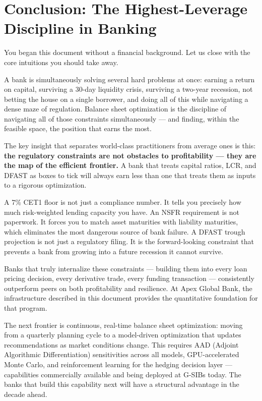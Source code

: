 \documentclass[12pt,a4paper]{article}
\begin{document}
\section{Conclusion: The Highest-Leverage Discipline in Banking}

You began this document without a financial background.  Let us close with the
core intuitions you should take away.

A bank is simultaneously solving several hard problems at once: earning a
return on capital, surviving a 30-day liquidity crisis, surviving a two-year
recession, not betting the house on a single borrower, and doing all of this
while navigating a dense maze of regulation.  Balance sheet optimization is
the discipline of navigating all of those constraints simultaneously ---
and finding, within the feasible space, the position that earns the most.

The key insight that separates world-class practitioners from average ones
is this: \textbf{the regulatory constraints are not obstacles to profitability
--- they are the map of the efficient frontier.}  A bank that treats capital
ratios, LCR, and DFAST as boxes to tick will always earn less than one that
treats them as inputs to a rigorous optimization.

A 7\% CET1 floor is not just a compliance number.  It tells you precisely
how much risk-weighted lending capacity you have.  An NSFR requirement is
not paperwork.  It forces you to match asset maturities with liability
maturities, which eliminates the most dangerous source of bank failure.
A DFAST trough projection is not just a regulatory filing.  It is the
forward-looking constraint that prevents a bank from growing into a future
recession it cannot survive.

Banks that truly internalize these constraints --- building them into every
loan pricing decision, every derivative trade, every funding transaction ---
consistently outperform peers on both profitability and resilience.
At Apex Global Bank, the infrastructure described in this document provides
the quantitative foundation for that program.

The next frontier is continuous, real-time balance sheet optimization:
moving from a quarterly planning cycle to a model-driven optimization
that updates recommendations as market conditions change.  This requires
AAD (Adjoint Algorithmic Differentiation) sensitivities across all models,
GPU-accelerated Monte Carlo, and reinforcement learning for the hedging
decision layer --- capabilities commercially available and being deployed
at G-SIBs today.  The banks that build this capability next will have
a structural advantage in the decade ahead.
\end{document}
